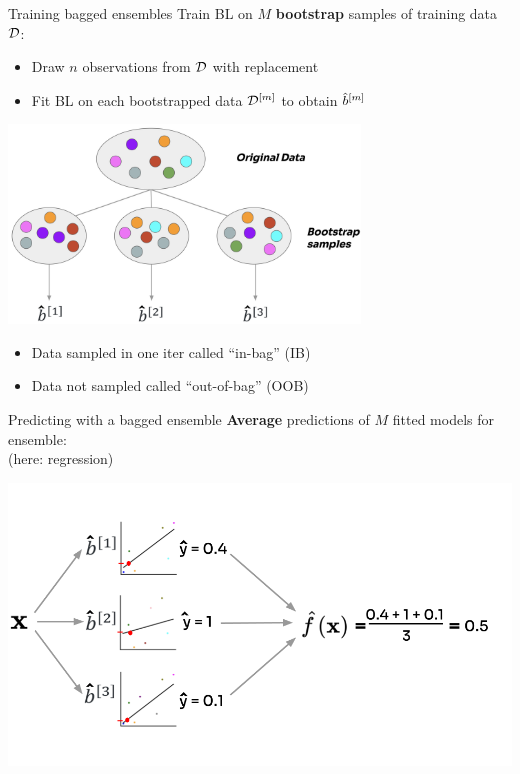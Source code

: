 \documentclass[11pt,compress,t,notes=noshow, xcolor=table]{beamer}
\begin{document}
\begin{vbframe}{Training bagged ensembles}
Train BL on $M$ \textbf{bootstrap} samples of training data $\mathcal{D}$:
\begin{itemize}
  \item Draw $n$ observations from $\mathcal{D}$ with replacement
  \item Fit BL on each bootstrapped data $\mathcal{D}^{[m]}$ to obtain $\hat{b}^{[m]}$
\end{itemize}

\begin{center}
\includegraphics[width=0.7\textwidth]{figure_man/forest-bagging.png}

\begin{itemize}
  \item Data sampled in one iter called ``in-bag'' (IB)
  \item Data not sampled called ``out-of-bag'' (OOB)
\end{itemize}

\end{center}

\end{vbframe}

\begin{vbframe}{Predicting with a bagged ensemble}
\textbf{Average} predictions of $M$ fitted models for ensemble:\\
(here: regression)
\vspace{1ex}
\begin{center}
\includegraphics[width=1\textwidth]{figure_man/forest-bagg_regr.png}
\end{center}
\end{vbframe}
\end{document}

